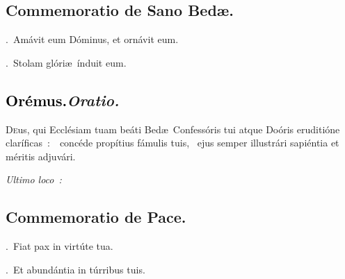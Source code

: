 \documentclass[12pt]{article} %
\newenvironment{rubric}{\vspace{1 mm}\color{benred8} \itshape \leftskip 0in \setlength{\parindent}{0.25in}}{\vspace{1 mm}}
\newenvironment{response}{\leftskip 0in \setlength{\parindent}{0in}}{\vspace{1 mm}}
\let\oldgresixstar\gresixstar
\renewcommand{\gresixstar}{\textcolor{benred8}{\oldgresixstar}}
\let\oldgredagger\gredagger
\renewcommand{\gredagger}{\textcolor{benred8}{\oldgredagger}}
\let\oldVbar\Vbar
\renewcommand{\Vbar}{\textcolor{benred8}{\oldVbar .}}
\let\oldRbar\Rbar
\renewcommand{\Rbar}{\textcolor{benred8}{\oldRbar .}}
\def\capitulumSpace{\hspace{20 mm}}
\begin{document}
\subsection*{Commemoratio de Sano Bed\ae .}

\gresetfirstlineaboveinitial{\small \textsc{ \textbf{\textcolor{benred8}{II}}}}{\small \textsc{ \textbf{\textcolor{benred8}{II}}}}


\begin{response}
\Vbar\ Am\'{a}vit eum D\'{o}minus, et orn\'{a}vit eum.

\Rbar\ Stolam gl\'{o}ri\ae\ \'{i}nduit eum.

\end{response}

\subsection*{\textcolor{black}{Or\'{e}mus.}\capitulumSpace \emph{Oratio.}}

\begin{response}\lettrine{D}{e}us, qui Eccl\'{e}siam tuam be\'{a}ti Bed\ae\ Confess\'{o}ris tui atque Do\'{o}ris eruditi\'{o}ne clar\'{i}ficas~:~\gredagger\ conc\'{e}de prop\'{i}tius f\'{a}mulis tuis, \gresixstar\ ejus semper illustr\'{a}ri sapi\'{e}ntia et m\'{e}ritis adjuv\'{a}ri.

\end{response}

\begin{rubric}
Ultimo loco~:

\end{rubric}



\subsection*{Commemoratio de Pace.}


\gresetfirstlineaboveinitial{\small \textsc{ \textbf{\textcolor{benred8}{II}}}}{\small \textsc{ \textbf{\textcolor{benred8}{II}}}}

\begin{response}
\Vbar\ Fiat pax in virt\'{u}te tua.

\Rbar\ Et abund\'{a}ntia in t\'{u}rribus tuis.

\end{response}
\end{document}
